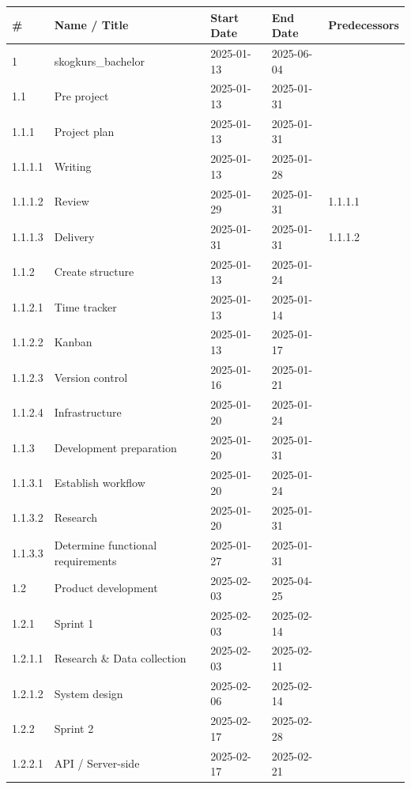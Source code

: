 \newpage
\begin{table}[H]
    \centering
    \begin{tabular}{|l|l|l|l|l|}
    \hline
        \# & Name / Title & Start Date & End Date & Predecessors \\ \hline
        1 & skogkurs\_bachelor & 2025-01-13 & 2025-06-04 & ~ \\ \hline
        1.1 & Pre project & 2025-01-13 & 2025-01-31 & ~ \\ \hline
        1.1.1 & Project plan & 2025-01-13 & 2025-01-31 & ~ \\ \hline
        1.1.1.1 & Writing & 2025-01-13 & 2025-01-28 & ~ \\ \hline
        1.1.1.2 & Review & 2025-01-29 & 2025-01-31 & 1.1.1.1 \\ \hline
        1.1.1.3 & Delivery & 2025-01-31 & 2025-01-31 & 1.1.1.2 \\ \hline
        1.1.2 & Create structure & 2025-01-13 & 2025-01-24 & ~ \\ \hline
        1.1.2.1 & Time tracker & 2025-01-13 & 2025-01-14 & ~ \\ \hline
        1.1.2.2 & Kanban & 2025-01-13 & 2025-01-17 & ~ \\ \hline
        1.1.2.3 & Version control & 2025-01-16 & 2025-01-21 & ~ \\ \hline
        1.1.2.4 & Infrastructure & 2025-01-20 & 2025-01-24 & ~ \\ \hline
        1.1.3 & Development preparation & 2025-01-20 & 2025-01-31 & ~ \\ \hline
        1.1.3.1 & Establish workflow & 2025-01-20 & 2025-01-24 & ~ \\ \hline
        1.1.3.2 & Research & 2025-01-20 & 2025-01-31 & ~ \\ \hline
        1.1.3.3 & Determine functional requirements & 2025-01-27 & 2025-01-31 & ~ \\ \hline
        1.2 & Product development & 2025-02-03 & 2025-04-25 & ~ \\ \hline
        1.2.1 & Sprint 1 & 2025-02-03 & 2025-02-14 & ~ \\ \hline
        1.2.1.1 & Research \& Data collection & 2025-02-03 & 2025-02-11 & ~ \\ \hline
        1.2.1.2 & System design & 2025-02-06 & 2025-02-14 & ~ \\ \hline
        1.2.2 & Sprint 2 & 2025-02-17 & 2025-02-28 & ~ \\ \hline
        1.2.2.1 & API / Server-side & 2025-02-17 & 2025-02-21 & ~ \\ \hline

\end{tabular}
\end{table}

